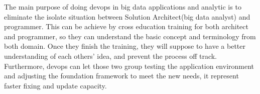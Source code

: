 \documentclass[sigconf]{acmart}
\begin{document}
The main purpose of doing devops in big data applications and analytic is to eliminate the isolate situation between Solution Architect(big data analyst) and programmer. This can be achieve by cross education training for both architect and programmer, so they can understand the basic concept and terminology from both domain. Once they finish the training, they will suppose to have a better understanding of each others' idea, and prevent the process off track. Furthermore, devops can let those two group testing the application environment and adjusting the foundation framework to meet the new needs, it represent faster fixing and update capacity. 







 


\end{document}
